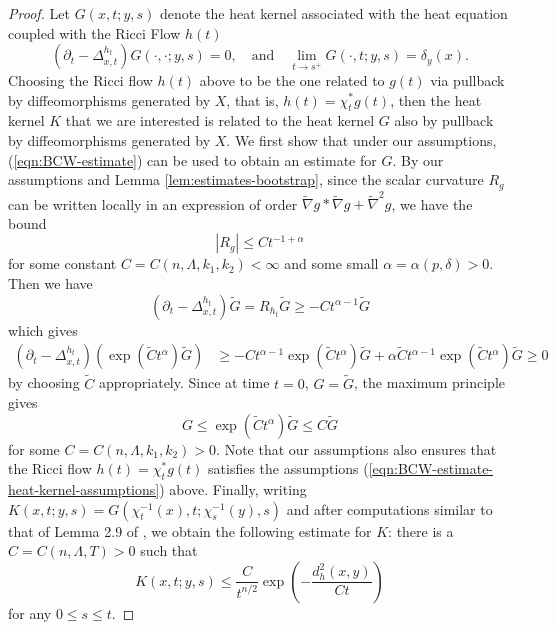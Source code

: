 \documentclass[12pt]{amsart}
\theoremstyle{plain}
\theoremstyle{plain}
\theoremstyle{definition}
\theoremstyle{remark}
\numberwithin{equation}{subsection}
\newcommand{\hdel}{\tilde{\nabla}}
\begin{document}
\begin{proof}
    Let $G(x,t;y,s)$ denote the heat kernel associated with the heat equation coupled with the Ricci Flow $h(t)$
    \begin{equation*}
        \left(\partial_t - \Delta^{h_t}_{x,t}\right)G(\cdot,\cdot;y,s) = 0,\quad \text{and}\quad \lim\limits_{t\to s^+}G(\cdot,t;y,s) = \delta_y(x).
    \end{equation*}
    Choosing the Ricci flow $h(t)$ above to be the one related to $g(t)$ via pullback by diffeomorphisms generated by $X$, that is, $h(t) = \chi_t^\ast g(t)$, then the heat kernel $K$ that we are interested is related to the heat kernel $G$ also by pullback by diffeomorphisms generated by $X$. We first show that under our assumptions, (\ref{eqn:BCW-estimate}) can be used to obtain an estimate for $G$. By our assumptions and Lemma \ref{lem:estimates-bootstrap}, since the scalar curvature $R_g$ can be written locally in an expression of order $\hdel g \ast \hdel g + \hdel^2 g$, we have the bound
    \begin{equation*}
        |R_g| \leq Ct^{-1+\alpha}
    \end{equation*}
    for some constant $C = C(n,\Lambda,k_1,k_2) < \infty$ and some small $\alpha = \alpha(p,\delta) > 0$. Then we have
    \begin{equation*}
        \left(\partial_t - \Delta^{h_t}_{x,t}\right)\widetilde{G} = R_{h_t}\widetilde{G} \geq -Ct^{\alpha-1}\widetilde{G}
    \end{equation*}
    which gives
    \begin{align*}
        \left(\partial_t - \Delta^{h_t}_{x,t}\right)(\exp{(\widetilde{C}t^\alpha)}\widetilde{G}) &\geq -Ct^{\alpha - 1}\exp{(\widetilde{C}t^\alpha)}\widetilde{G} + \alpha\widetilde{C}t^{\alpha-1}\exp{(\widetilde{C}t^\alpha)}\widetilde{G} \geq 0
    \end{align*}
    by choosing $\widetilde{C}$ appropriately. Since at time $t = 0$, $G = \widetilde{G}$, the maximum principle gives
    \begin{equation*}
        G \leq \exp{(\widetilde{C}t^\alpha)}\widetilde{G} \leq C\widetilde{G}
    \end{equation*}
    for some $C = C(n,\Lambda,k_1,k_2) > 0$. Note that our assumptions also ensures that the Ricci flow $h(t) = \chi_t^\ast g(t)$ satisfies the assumptions (\ref{eqn:BCW-estimate-heat-kernel-assumptions}) above. Finally, writing $K(x,t;y,s) = G(\chi_t^{-1}(x),t;\chi_s^{-1}(y),s)$ and after computations similar to that of Lemma 2.9 of \cite{burkhardt-guim_pointwise_2019}, we obtain the following estimate for $K$: there is a $C = C(n,\Lambda,T) > 0$ such that
    \begin{equation}\label{eqn:gradient-estimate-K-heat-kernel-estimate}
        K(x,t;y,s) \leq \frac{C}{t^{n/2}}\exp{\left(-\frac{d^2_h(x,y)}{Ct}\right)}
    \end{equation}
    for any $0 \leq s \leq t$.
    

\end{proof}
\end{document}
